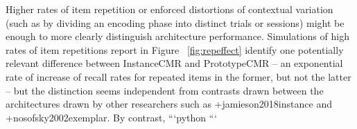 {}Higher rates of item repetition or enforced distortions of contextual variation (such as by dividing an encoding phase into distinct trials or sessions) might be enough to more clearly distinguish architecture performance. Simulations of high rates of item repetitions report in Figure ~\ref{fig:repeffect} identify one potentially relevant difference between InstanceCMR and PrototypeCMR -- an exponential rate of increase of recall rates for repeated items in the former, but not the latter -- but the distinction seems independent from contrasts drawn between the architectures drawn by other researchers such as +{}{}{jamieson2018instance} and +{}{}{nosofsky2002exemplar}. By contrast, \markdownRendererInterblockSeparator
{}```python\markdownRendererInterblockSeparator
{}```\relax